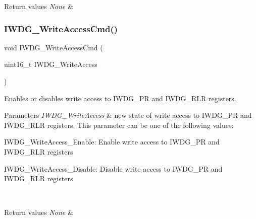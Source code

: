 \begin{DoxyRetVals}{Return values}
{\em None} & \\
\hline
\end{DoxyRetVals}
\mbox{\label{group___i_w_d_g___exported___functions_gae466681e5bdc11b353c508b89d75ca05}} 
\subsubsection{\texorpdfstring{IWDG\_WriteAccessCmd()}{IWDG\_WriteAccessCmd()}}
{\footnotesize\ttfamily void I\+W\+D\+G\+\_\+\+Write\+Access\+Cmd (\begin{DoxyParamCaption}\item[{uint16\+\_\+t}]{I\+W\+D\+G\+\_\+\+Write\+Access }\end{DoxyParamCaption})}



Enables or disables write access to I\+W\+D\+G\+\_\+\+PR and I\+W\+D\+G\+\_\+\+R\+LR registers. 


\begin{DoxyParams}{Parameters}
{\em I\+W\+D\+G\+\_\+\+Write\+Access} & new state of write access to I\+W\+D\+G\+\_\+\+PR and I\+W\+D\+G\+\_\+\+R\+LR registers. This parameter can be one of the following values\+: \begin{DoxyItemize}
\item I\+W\+D\+G\+\_\+\+Write\+Access\+\_\+\+Enable\+: Enable write access to I\+W\+D\+G\+\_\+\+PR and I\+W\+D\+G\+\_\+\+R\+LR registers \item I\+W\+D\+G\+\_\+\+Write\+Access\+\_\+\+Disable\+: Disable write access to I\+W\+D\+G\+\_\+\+PR and I\+W\+D\+G\+\_\+\+R\+LR registers \end{DoxyItemize}
\\
\hline
\end{DoxyParams}

\begin{DoxyRetVals}{Return values}
{\em None} & \\
\hline
\end{DoxyRetVals}
